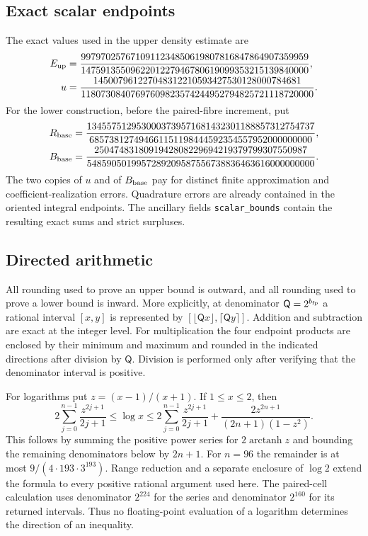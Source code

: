 \subsection{Exact scalar endpoints}
The exact values used in the upper density estimate are
\begin{align}
 E_{\rm up}&=\frac{9979702576710911234850619807816847864907359959}
 {1475913550962201227946780619099353215139840000},
 \label{eq:current-E}\\
 u&=\frac{145007961227048312210593427530128000784681}
 {11807308407697609823574244952794825721118720000}.
 \label{eq:current-u}
\end{align}
For the lower construction, before the paired-fibre increment, put
\begin{align}
 R_{\rm base}&=
 \frac{1345575129530003739571681432301188857312754737}
 {685738127494661151198444592354557952000000000},
 \label{eq:base-R}\\
 B_{\rm base}&=
 \frac{2504748318091942808229694219379799307550987}
 {5485905019957289209587556738836463616000000000}.
 \label{eq:base-B}
\end{align}
The two copies of $u$ and of $B_{\rm base}$ pay for distinct finite
approximation and coefficient-realization errors. Quadrature errors
are already contained in the oriented integral endpoints. The ancillary
fields \texttt{scalar\_bounds} contain the resulting exact sums and
strict surpluses.

\subsection{Directed arithmetic}
All rounding used to prove an upper bound is outward, and all rounding
used to prove a lower bound is inward.  More explicitly, at denominator
$\mathsf Q=2^{b_{\rm fp}}$ a rational interval $[x,y]$ is represented by
$[\lfloor \mathsf Q x\rfloor,\lceil \mathsf Q y\rceil]$.  Addition and subtraction
are exact at the integer level.  For multiplication the four endpoint
products are enclosed by their minimum and maximum and rounded in the
indicated directions after division by $\mathsf Q$.  Division is performed
only after verifying that the denominator interval is positive.

For logarithms put $z=(x-1)/(x+1)$.  If $1\le x\le2$, then
\begin{equation}
 2\sum_{j=0}^{n-1}\frac{z^{2j+1}}{2j+1}
 \le\log x\le
 2\sum_{j=0}^{n-1}\frac{z^{2j+1}}{2j+1}
 +\frac{2z^{2n+1}}{(2n+1)(1-z^2)}.
 \label{num:log-enclosure}
\end{equation}
This follows by summing the positive power series for
$2\operatorname{arctanh}z$ and bounding the remaining denominators
below by $2n+1$.  For $n=96$ the remainder is at most
$9/(4\cdot193\cdot3^{193})$.  Range reduction and a separate
enclosure of $\log2$ extend the formula to every positive rational
argument used here.  The paired-cell calculation uses denominator
$2^{224}$ for the series and denominator $2^{160}$ for its returned
intervals.  Thus no floating-point evaluation of a logarithm determines
the direction of an inequality.

